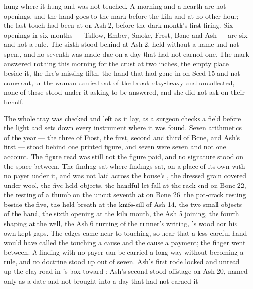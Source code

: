  hung where it hung and was not touched. A morning and a hearth are not openings, and the hand goes to the mark before the kiln and at no other hour; the last touch had been at  on Ash 2, before the dark month's first firing. Six openings in six months --- Tallow, Ember, Smoke, Frost, Bone and Ash --- are six and not a rule. The sixth stood behind at Ash 2, held without a name and not spent, and no seventh was made due on a day that had not earned one. The mark answered nothing this morning for the crust at two inches, the empty place beside it, the fire's missing fifth, the hand that had gone in on Seed 15 and not come out, or the woman carried out of the brook clay-heavy and uncollected; none of those stood under it asking to be answered, and she did not ask on their behalf.

\scenebreak

The whole tray was checked and left as it lay, as a surgeon checks a field before the light and sets down every instrument where it was found. Seven arithmetics of the year --- the three of Frost, the first, second and third of Bone, and Ash's first --- stood behind one printed figure, and seven were seven and not one account. The figure read was still not the figure paid, and no signature stood on the space between. The finding sat where findings sat, on a place of its own with no payer under it, and was not laid across the house's , the dressed grain covered under wool, the five held objects, the handful let fall at the rack end on Bone 22, the resting of a thumb on the uncut seventh at  on Bone 26, the pot-crack resting beside the five, the held breath at the knife-sill of Ash 14, the two small objects of the hand, the sixth opening at the kiln mouth, the Ash 5 joining, the fourth shaping at the well, the Ash 6 turning of the runner's writing, 's wood nor his own kept gaps. The edges came near to touching, so near that a less careful hand would have called the touching a cause and the cause a payment; the finger went between. A finding with no payer can be carried a long way without becoming a rule, and no doctrine stood up out of seven. Ash's first rode locked and unread up the clay road in 's box toward ; Ash's second stood offstage on Ash 20, named only as a date and not brought into a day that had not earned it.

